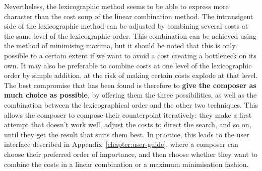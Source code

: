 Nevertheless, the lexicographic method seems to be able to express more character than the cost soup of the linear combination method. The intransigent side of the lexicographic method can be adjusted by combining several costs at the same level of the lexicographic order. This combination can be achieved using the method of minimising maxima, but it should be noted that this is only possible to a certain extent if we want to avoid a cost creating a bottleneck on its own. It may also be preferable to combine costs at one level of the lexicographic order by simple addition, at the risk of making certain costs explode at that level.
The best compromise that has been found is therefore to \textbf{give the composer as much choice as possible}, by offering them the three possibilities, as well as the combination between the lexicographical order and the other two techniques. This allows the composer to compose their counterpoint iteratively: they make a first attempt that doesn't work well, adjust the costs to direct the search, and so on, until they get the result that suits them best. In practice, this leads to the user interface described in Appendix~\ref{chapter:user-guide}, where a composer can choose their preferred order of importance, and then choose whether they want to combine the costs in a linear combination or a maximum minimisation fashion.

